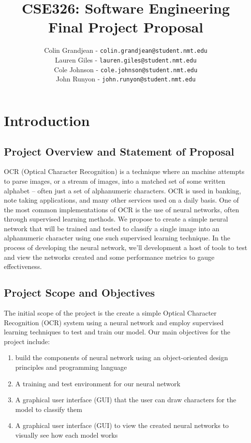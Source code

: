 \documentclass[english,12pt]{article}
\author{
        Colin Grandjean - \texttt{colin.grandjean@student.nmt.edu} \\
        Lauren Giles - \texttt{lauren.giles@student.nmt.edu} \\
        Cole Johnson - \texttt{cole.johnson@student.nmt.edu} \\
        John Runyon  - \texttt{john.runyon@student.nmt.edu}
}
\title{ \textbf{CSE326: Software Engineering} \\
        Final Project Proposal
}
\begin{document}
\maketitle
{\footnotesize\tableofcontents} %
\pagebreak
\section{Introduction}

\subsection{Project Overview and Statement of Proposal}
OCR (Optical Character Recognition) is a technique where an machine attempts
to parse images, or a stream of images, into a matched set of some written
alphabet -- often just a set of alphanumeric characters. OCR is used in banking,
note taking applications, and many other services used on a daily basis.
One of the most common implementations of OCR is the use of neural networks,
often through supervised learning methods. We propose to create a simple neural
network that will be trained and tested to classify a single image into an
alphanumeric character using one such supervised learning technique. In
the process of developing the neural network, we'll development a host of tools
to test and view the networks created and some performance metrics to gauge
effectiveness.

\subsection{Project Scope and Objectives}
The initial scope of the project is the create a simple Optical Character Recognition (OCR)
system using a neural network and employ supervised learning techniques to test and train our
model. Our main objectives for the project include:
\begin{enumerate}[(a.)]
  \item build the components of neural network using an object-oriented design principles and programming language
  \item A training and test environment for our neural network
  \item A graphical user interface (GUI) that the user can draw characters
    for the model to classify them
  \item A graphical user interface (GUI) to view the created neural networks to
    visually see how each model works
\end{enumerate}
\end{document}
